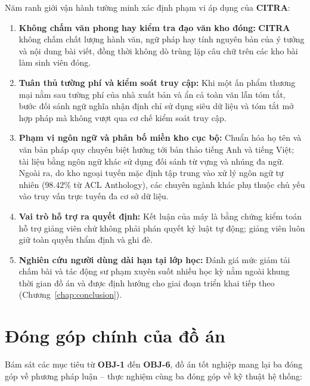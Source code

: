 Năm ranh giới vận hành tường minh xác định phạm vi áp dụng của \textbf{CITRA}:
\begin{enumerate}
    \item \textbf{Không chấm văn phong hay kiểm tra đạo văn kho đóng:} \textbf{CITRA} không chấm chất lượng hành văn, ngữ pháp hay tính nguyên bản của ý tưởng và nội dung bài viết, đồng thời không dò trùng lặp câu chữ trên các kho bài làm sinh viên đóng.
    \item \textbf{Tuân thủ tường phí và kiểm soát truy cập:} Khi một ấn phẩm thương mại nằm sau tường phí của nhà xuất bản và ẩn cả toàn văn lẫn tóm tắt, bước đối sánh ngữ nghĩa nhận định chỉ sử dụng siêu dữ liệu và tóm tắt mở hợp pháp mà không vượt qua cơ chế kiểm soát truy cập.
    \item \textbf{Phạm vi ngôn ngữ và phân bố miền kho cục bộ:} Chuẩn hóa họ tên và văn bản pháp quy chuyên biệt hướng tới bản thảo tiếng Anh và tiếng Việt; tài liệu bằng ngôn ngữ khác sử dụng đối sánh từ vựng và nhúng đa ngữ. Ngoài ra, do kho ngoại tuyến mặc định tập trung vào xử lý ngôn ngữ tự nhiên ($98.42\%$ từ ACL Anthology), các chuyên ngành khác phụ thuộc chủ yếu vào truy vấn trực tuyến đa cơ sở dữ liệu.
    \item \textbf{Vai trò hỗ trợ ra quyết định:} Kết luận của máy là bằng chứng kiểm toán hỗ trợ giảng viên chứ không phải phán quyết kỷ luật tự động; giảng viên luôn giữ toàn quyền thẩm định và ghi đè.
    \item \textbf{Nghiên cứu người dùng dài hạn tại lớp học:} Đánh giá mức giảm tải chấm bài và tác động sư phạm xuyên suốt nhiều học kỳ nằm ngoài khung thời gian đồ án và được định hướng cho giai đoạn triển khai tiếp theo (Chương~\ref{chap:conclusion}).
\end{enumerate}

\section{Đóng góp chính của đồ án}

Bám sát các mục tiêu từ \textbf{OBJ-1} đến \textbf{OBJ-6}, đồ án tốt nghiệp mang lại ba đóng góp về phương pháp luận -- thực nghiệm cùng ba đóng góp về kỹ thuật hệ thống:

